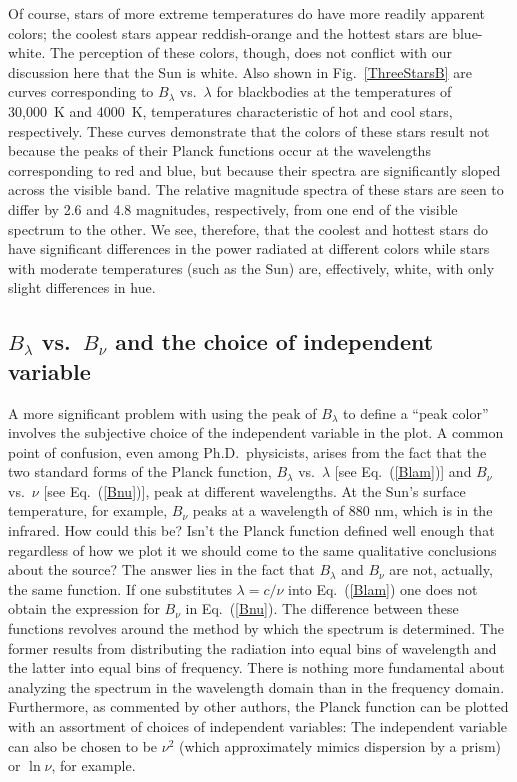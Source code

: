 \documentclass[12pt,aps,prb,preprint]{revtex4}   %
\begin{document}
Of course, stars of more extreme temperatures do have more readily apparent colors; the coolest stars appear reddish-orange and the hottest stars are blue-white.  The perception of these colors, though, does not conflict with our discussion here that the Sun is white.  Also shown in Fig.\ \ref{ThreeStarsB} are curves corresponding to $B_\lambda$ vs.\ $\lambda$ for blackbodies at the temperatures of 30,000~K and 4000~K, temperatures characteristic of hot and cool stars, respectively.  These curves demonstrate that the colors of these stars result not because the peaks of their Planck functions occur at the wavelengths corresponding to red and blue, but because their spectra are significantly sloped across the visible band.  The relative magnitude spectra of these stars are seen to differ by 2.6 and 4.8 magnitudes, respectively, from one end of the visible spectrum to the other.  We see, therefore, that the coolest and hottest stars do have significant differences in the power radiated at different colors while stars with moderate temperatures (such as the Sun) are, effectively, white, with only slight differences in hue.  

\subsection{$B_\lambda$ vs.\ $B_\nu$ and the choice of independent variable}

A more significant problem with using the peak of $B_\lambda$ to define a ``peak color'' involves the subjective choice of the independent variable in the plot.  A common point of confusion, even among Ph.D.\ physicists, arises from the fact that the two standard forms of the Planck function, 
$B_\lambda$ vs.\ $\lambda$ [see Eq.~(\ref{Blam})] and 
$B_\nu$ vs.\ $\nu$ [see Eq.~(\ref{Bnu})], peak at different wavelengths.  At the Sun's surface temperature, for example, $B_\nu$ peaks at a wavelength of 880 nm, which is in the infrared.  How could this be?  Isn't the Planck function defined well enough that regardless of how we plot it we should come to the same qualitative conclusions about the source?
The answer lies in the fact that $B_\lambda$ and $B_\nu$ are not, actually, the same function.  If one substitutes $\lambda = c / \nu$ into Eq.~(\ref{Blam}) one does not obtain the expression for $B_\nu$ in Eq.~(\ref{Bnu}).
The difference between these functions revolves around the method by which the spectrum is determined.  The former results from distributing the radiation into equal bins of wavelength and the latter into equal bins of frequency.  There is nothing more fundamental about analyzing the spectrum in the wavelength domain than in the frequency domain.  Furthermore, as commented by other authors, the Planck function can be plotted with an assortment of choices of independent variables:  The independent variable can also be chosen to be $\nu^2$ (which approximately mimics dispersion by a prism) or $\ln\nu$, for example.\cite{Heald,Stewart}  
\end{document}
